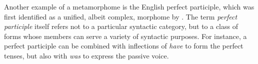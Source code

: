 

Another example of a metamorphome is the English perfect participle, which was first 
identified as a unified, albeit complex, morphome by \cite{aronoff:1994}. The term \emph{perfect participle} 
itself refers not to a particular syntactic category, but 
to a class of 
forms whose members 
can serve a variety of  syntactic purposes. For instance, a perfect participle can be combined
with inflections of \emph{have} to form the perfect tenses, but also with 
\emph{was} to express the passive voice. 

